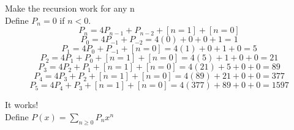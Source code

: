 \documentclass[10pt, AMS Euler]{article}
\begin{document}




    

    Make the recursion work for any n\\
    Define $P_n=0$ if $n<0$. \\

    $$ P_n = 4P_{n-1} + P_{n-2} + [n=1] + [n=0] $$
    $$ P_0 = 4P_{-1} + P_{-2} = 4(0) + 0 + 0 + 1 = 1 $$
    $$ P_1 = 4P_{0} + P_{-1} + [n=0] = 4(1) + 0 + 1 + 0 = 5 $$
    $$ P_2 = 4P_{1} + P_{0} + [n=1] + [n=0] = 4(5) + 1 + 0 + 0 = 21 $$
    $$ P_3 = 4P_{2} + P_{1} + [n=1] + [n=0] = 4(21) + 5 + 0 + 0 = 89 $$
    $$ P_4 = 4P_{3} + P_{2} + [n=1] + [n=0] = 4(89) + 21 + 0 + 0 = 377 $$
    $$ P_5 = 4P_{4} + P_{3} + [n=1] + [n=0] = 4(377) + 89 + 0 + 0 = 1597 $$

    It works! \\
    Define $P(x) = \sum_{n \geq 0} P_n x^n$ \\
    
\end{document}
